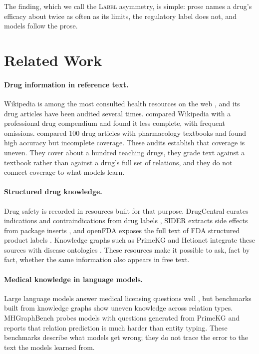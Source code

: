 \documentclass[letterpaper]{article} %
\newcommand{\lbl}{\textsc{Label}}
\begin{document}
The finding, which we call the \lbl{} asymmetry, is simple: prose names a
drug's efficacy about twice as often as its limits, the regulatory label does
not, and models follow the prose.

\section{Related Work}

\paragraph{Drug information in reference text.}
Wikipedia is among the most consulted health resources on the web
\citep{heilman2011wikipedia}, and its drug articles have been audited several
times. \citet{clauson2008scope} compared Wikipedia with a professional drug
compendium and found it less complete, with frequent omissions.
\citet{kraenbring2014accuracy} compared 100 drug articles with pharmacology
textbooks and found high accuracy but incomplete coverage. These audits
establish that coverage is uneven. They cover about a hundred teaching drugs,
they grade text against a textbook rather than against a drug's full set of
relations, and they do not connect coverage to what models learn.

\paragraph{Structured drug knowledge.}
Drug safety is recorded in resources built for that purpose. DrugCentral
curates indications and contraindications from drug labels
\citep{ursu2017drugcentral}, SIDER extracts side effects from package inserts
\citep{kuhn2016sider}, and openFDA exposes the full text of FDA structured
product labels \citep{kasshout2016openfda}. Knowledge graphs such as PrimeKG
and Hetionet integrate these sources with disease ontologies
\citep{chandak2023primekg,himmelstein2017hetionet}. These resources make it
possible to ask, fact by fact, whether the same information also appears in
free text.

\paragraph{Medical knowledge in language models.}
Large language models answer medical licensing questions well
\citep{singhal2023clinical,singhal2025expert}, but benchmarks built from
knowledge graphs show uneven knowledge across relation types. MHGraphBench
\citep{liu2026mhgraphbench} probes models with questions generated from PrimeKG
and reports that relation prediction is much harder than entity typing. These
benchmarks describe what models get wrong; they do not trace the error to the
text the models learned from.
\end{document}
